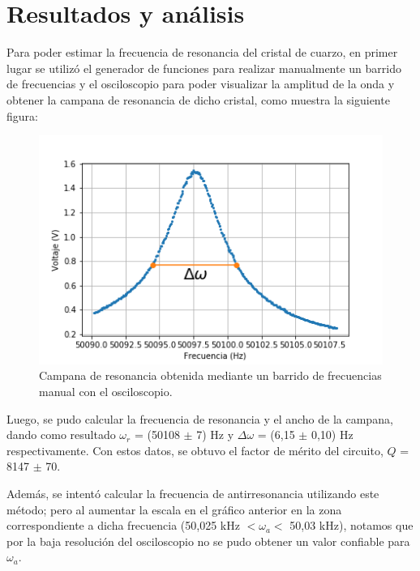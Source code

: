 \documentclass[twoside,twocolumn,a4paper]{article}
\begin{document}
\section{Resultados y an\'alisis}

Para poder estimar la frecuencia de resonancia del cristal de cuarzo, en primer lugar se utiliz\'o el generador de funciones para realizar manualmente un barrido de frecuencias y el osciloscopio para poder visualizar la amplitud de la onda y obtener la campana de resonancia de dicho cristal, como muestra la siguiente figura:

\begin{figure}[H]
\includegraphics[width=\linewidth]{detallecampanaOSC.png}
\caption{Campana de resonancia obtenida mediante un barrido de frecuencias manual con el osciloscopio.}
\label{fig:detallecampanaOSC}
\end{figure}

Luego, se pudo calcular la frecuencia de resonancia y el ancho de la campana, dando como resultado $\omega_{r}$ = (50108 $\pm$ 7) Hz y $\Delta \omega$ = (6,15 $\pm$ 0,10) Hz respectivamente. Con estos datos, se obtuvo el factor de m\'erito del circuito, $Q$ = 8147 $\pm$ 70. \newline

\par
Adem\'as, se intent\'o calcular la frecuencia de antirresonancia utilizando este m\'etodo; pero al aumentar la escala en el gr\'afico anterior en la zona correspondiente a dicha frecuencia (50,025 kHz $< \omega_{a} <$ 50,03 kHz), notamos que por la baja resoluci\'on del osciloscopio no se pudo obtener un valor confiable para $\omega_{a}$. \newline
\end{document}
